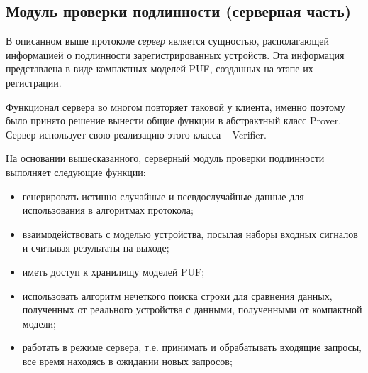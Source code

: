 \subsection{Модуль проверки подлинности (серверная часть)}
В описанном выше протоколе \emph{сервер} является сущностью, располагающей информацией о подлинности зарегистрированных устройств. Эта информация представлена в виде компактных моделей PUF, созданных на этапе их регистрации.

Функционал сервера во многом повторяет таковой у клиента, именно поэтому было принято решение вынести общие функции в абстрактный класс Prover. Сервер использует свою реализацию этого класса -- Verifier.

На основании вышесказанного, серверный модуль проверки подлинности выполняет следующие функции:
\begin{itemize}
  \item генерировать истинно случайные и псевдослучайные данные для использования в алгоритмах протокола;
  \item взаимодействовать с моделью устройства, посылая наборы входных сигналов и считывая результаты на выходе;
  \item иметь доступ к хранилищу моделей PUF;
  \item использовать алгоритм нечеткого поиска строки для сравнения данных, полученных от реального устройства с данными, полученными от компактной модели;
  \item работать в режиме сервера, т.е. принимать и обрабатывать входящие запросы, все время находясь в ожидании новых запросов;
\end{itemize}




